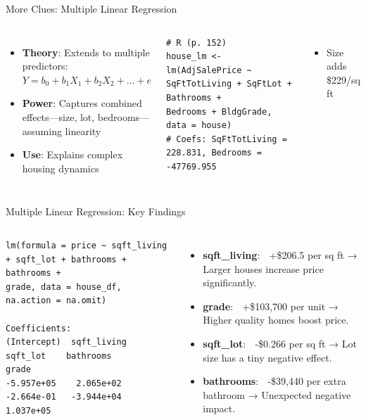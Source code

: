\documentclass{beamer}
\begin{document}
	\begin{frame}[fragile]{More Clues: Multiple Linear Regression}
		\begin{columns}
			\begin{itemize}
				\item \textbf{Theory}: Extends to multiple predictors: $Y = b_0 + b_1X_1 + b_2X_2 + \dots + e$
				\item \textbf{Power}: Captures combined effects—size, lot, bedrooms—assuming linearity
				\item \textbf{Use}: Explains complex housing dynamics
			\end{itemize}
			\begin{lstlisting}
# R (p. 152)
house_lm <- lm(AdjSalePrice ~ SqFtTotLiving + SqFtLot + Bathrooms +
Bedrooms + BldgGrade, data = house)
# Coefs: SqFtTotLiving = 228.831, Bedrooms = -47769.955
			\end{lstlisting}
			\begin{itemize}
				\item Size adds \$229/sq ft
			\end{itemize}
		\end{columns}
	\end{frame}
	


\begin{frame}[fragile]{Multiple Linear Regression: Key Findings}
	\begin{columns}
		\column{0.9\textwidth}
		\begin{lstlisting}
lm(formula = price ~ sqft_living + sqft_lot + bathrooms + bathrooms + 
grade, data = house_df, na.action = na.omit)

Coefficients:
(Intercept)  sqft_living     sqft_lot    bathrooms        grade  
-5.957e+05    2.065e+02   -2.664e-01   -3.944e+04    1.037e+05  
		\end{lstlisting}
		\begin{itemize}
			\item \textbf{sqft\_living}: 🏡 +\$206.5 per sq ft → Larger houses increase price significantly.
			\item \textbf{grade}: 🔼 +\$103,700 per unit → Higher quality homes boost price.
			\item \textbf{sqft\_lot}: 🌲 -\$0.266 per sq ft → Lot size has a tiny negative effect.
			\item \textbf{bathrooms}: 🚿 -\$39,440 per extra bathroom → Unexpected negative impact.
		\end{itemize}
	\end{columns}
\end{frame}
\end{document}
